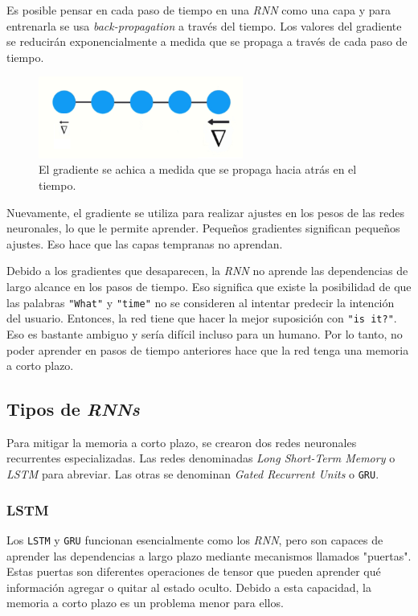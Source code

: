 \documentclass[a4paper,12pt]{article}
\begin{document}
Es posible pensar en cada paso de tiempo en una \textit{RNN} como una capa y para entrenarla se usa \textit{back-propagation} a través del tiempo. Los valores del gradiente se reducirán exponencialmente a medida que se propaga a través de cada paso de tiempo.

\begin{figure}[H]
	\begin{center}				
	\includegraphics[width=0.6\textwidth]{vanishing5.png}
  	\caption{El gradiente se achica a medida que se propaga hacia atrás en el tiempo.}
  	\label{fig:rnnvanishing5}
  	\end{center}
\end{figure}

Nuevamente, el gradiente se utiliza para realizar ajustes en los pesos de las redes neuronales, lo que le permite aprender. Pequeños gradientes significan pequeños ajustes. Eso hace que las capas tempranas no aprendan.

Debido a los gradientes que desaparecen, la \textit{RNN} no aprende las dependencias de largo alcance en los pasos de tiempo. Eso significa que existe la posibilidad de que las palabras \texttt{"What"} y \texttt{"time"} no se consideren al intentar predecir la intención del usuario. Entonces, la red tiene que hacer la mejor suposición con \texttt{"is it?"}. Eso es bastante ambiguo y sería difícil incluso para un humano. Por lo tanto, no poder aprender en pasos de tiempo anteriores hace que la red tenga una memoria a corto plazo.

\subsection{Tipos de \textit{RNNs}}
Para mitigar la memoria a corto plazo, se crearon dos redes neuronales recurrentes especializadas. Las redes denominadas \textit{Long Short-Term Memory} o \textit{LSTM} para abreviar. Las otras se denominan \textit{Gated Recurrent Units} o \texttt{GRU}.

\subsubsection{LSTM}
Los \texttt{LSTM} y \texttt{GRU} funcionan esencialmente como los \textit{RNN}, pero son capaces de aprender las dependencias a largo plazo mediante mecanismos llamados "puertas". Estas puertas son diferentes operaciones de tensor que pueden aprender qué información agregar o quitar al estado oculto. Debido a esta capacidad, la memoria a corto plazo es un problema menor para ellos. \citep{olahlstm}
\end{document}
